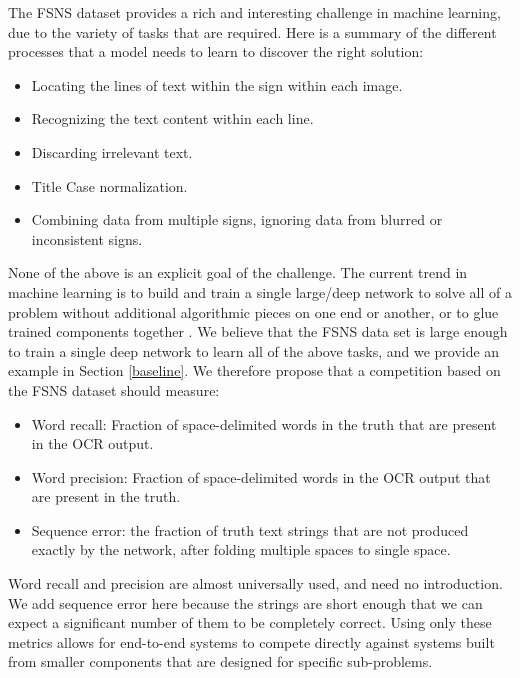\documentclass[runningheads]{llncs}
\begin{document}
The FSNS dataset provides a rich and interesting challenge in machine learning, due to the variety of
 tasks that are required. Here is a summary of the different processes that a model needs to learn to
 discover the right solution:
\begin{itemize}
\setlength\itemsep{0.5em}
\item[\labelitemii] Locating the lines of text within the sign within each image.
\item[\labelitemii] Recognizing the text content within each line.
\item[\labelitemii] Discarding irrelevant text.
\item[\labelitemii] Title Case normalization.
\item[\labelitemii] Combining data from multiple signs, ignoring data from blurred or inconsistent signs.
\end{itemize}

None of the above is an explicit goal of the challenge. The current trend in machine learning is
 to build and train a single large/deep network to solve all of a problem without additional
 algorithmic pieces on one end or another, or to glue trained components
 together \cite{vinyals2015show}\cite{graves2014towards}. We believe that the FSNS data set is large enough to train
 a single deep network to learn all of the above tasks,
 and we provide an example in Section \ref{baseline}.
 We therefore propose that a competition based on the FSNS dataset should measure:
\begin{itemize}
\setlength\itemsep{0.5em}
\item[\labelitemii] Word recall: Fraction of space-delimited words in the truth that are present in the OCR output.
\item[\labelitemii] Word precision: Fraction of space-delimited words in the OCR output that are present in the truth.
\item[\labelitemii] Sequence error: the fraction of truth text strings that are not produced exactly by
 the network, after folding multiple spaces to single space.
\end{itemize}
Word recall and precision are almost universally used, and need no introduction. We add sequence error
 here because the strings are short enough that we can expect a significant number of them to be
 completely correct. Using only these metrics allows for end-to-end systems to compete directly against
systems built from smaller components that are designed for specific sub-problems.
\end{document}
